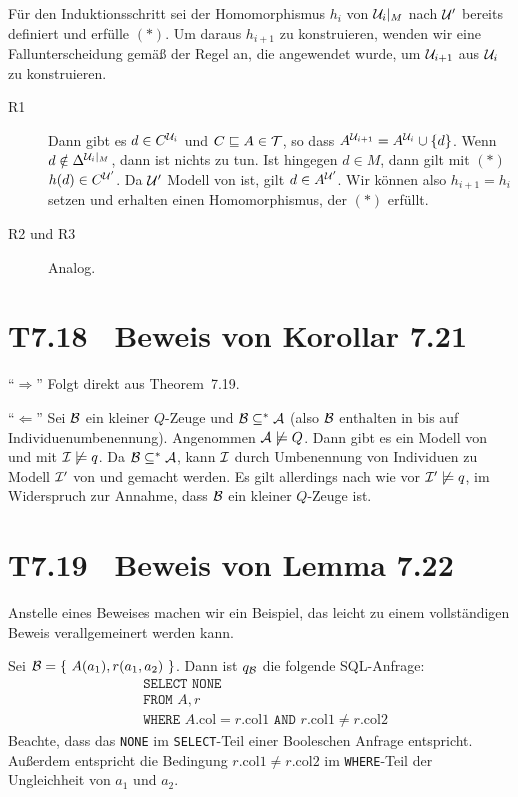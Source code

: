 \documentclass[fontsize=11pt, twoside=false, numbers=autoenddot]{scrbook}
\begin{document}
Für den Induktionsschritt sei der Homomorphismus $h_i$ von $\mathcal{U}_i|_M$ nach $\mathcal{U}'$
bereits definiert und erfülle $(*)$.
Um daraus $h_{i+1}$ zu konstruieren, wenden wir eine Fallunterscheidung gemäß
der Regel an, die angewendet wurde, um $\mathcal{U}_{i+1}$ aus $\mathcal{U}_i$ zu
konstruieren.
%
\begin{description}
  \item[\textsf{R1}]
    Dann gibt es $d \in C^{\mathcal{U}_i}$ und $C \sqsubseteq A \in \mathcal{T}$,
    so dass $A^{\mathcal{U}_{i+1}} = A^{\mathcal{U}_i} \cup \{d\}$.
    Wenn $d \notin \Delta^{\mathcal{U}_i|_M}$, dann ist nichts zu tun.
    Ist hingegen $d \in M$, dann gilt mit $(*)$ $h(d) \in C^{\mathcal{U}'}$.
    Da $\mathcal{U}'$ Modell von \Tmc ist, gilt $d \in A^{\mathcal{U}'}$.
    Wir können also $h_{i+1} = h_i$ setzen
    und erhalten einen Homomorphismus, der $(*)$ erfüllt.
  \item[\textsf{R2} und \textsf{R3}]
    Analog.
    \qedhere
\end{description}


\section*{T7.18~ Beweis von Korollar 7.21}

``$\Rightarrow$'' Folgt direkt aus Theorem~7.19.

\smallskip

``$\Leftarrow$'' Sei $\mathcal{B}$ ein kleiner $Q$-Zeuge und $\mathcal{B}\subseteq^*
\mathcal{A}$ (also $\mathcal{B}$ enthalten in \Amc bis auf Individuenumbenennung).
Angenommen $\mathcal{A}\not\models Q$. Dann gibt es ein Modell \Imc von \Amc
und \Tmc mit $\mathcal{I}\not\models q$. Da $\mathcal{B}\subseteq^*\mathcal{A}$, kann
$\mathcal{I}$ durch Umbenennung von Individuen zu Modell $\mathcal{I}'$ von \Bmc und
\Tmc gemacht werden. Es gilt allerdings nach wie vor $\mathcal{I}'\not\models
q$, im Widerspruch zur Annahme, dass $\mathcal{B}$ ein kleiner $Q$-Zeuge ist. 


\pagebreak
\section*{T7.19~ Beweis von Lemma 7.22}

Anstelle eines Beweises machen wir ein Beispiel, das leicht zu einem
vollständigen Beweis verallgemeinert werden kann.

Sei $\Bmc=\{\ A(a_1), r(a_1,a_2)\ \}$. Dann ist $q_\mathcal{B}$ die folgende
SQL-Anfrage: 
%
\begin{align*}
  & \texttt{SELECT NONE} \\
  & \texttt{FROM } A,r \\
  & \texttt{WHERE } A.\text{col} = r.\text{col1} \texttt{ AND }
  r.\text{col1} \neq r.\text{col2}
\end{align*}
%
Beachte, dass das \texttt{NONE} im \texttt{SELECT}-Teil einer Booleschen 
Anfrage entspricht. Außerdem entspricht die Bedingung $r.\text{col1} \neq
r.\text{col2}$ im \texttt{WHERE}-Teil der Ungleichheit von $a_1$ und
$a_2$.
  
\end{document}
